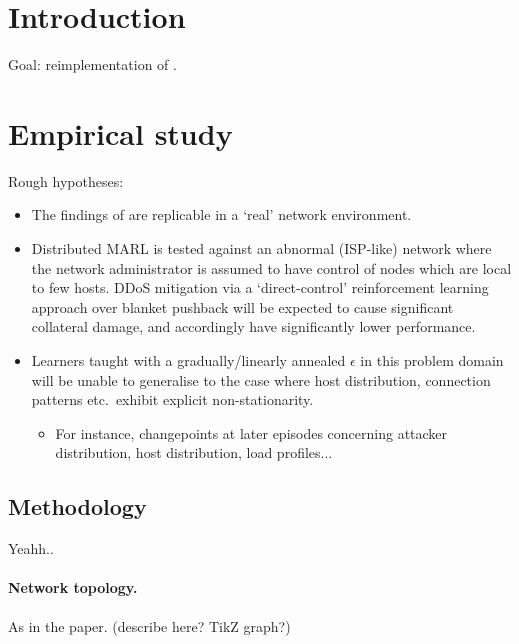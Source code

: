 \documentclass[10pt, a4paper]{article}
\title{\mytitle{}}
\author{Kyle A. Simpson}
\begin{document}

\maketitle

\section{Introduction}

Goal: reimplementation of \textcite{DBLP:journals/eaai/MalialisK15}.

\section{Empirical study}

Rough hypotheses:
\begin{itemize}
	\item The findings of \citeauthor{DBLP:journals/eaai/MalialisK15} are replicable in a `real' network environment.
	
	\item Distributed MARL is tested against an abnormal (ISP-like) network where the network administrator is assumed to have control of nodes which are local to few hosts.
	DDoS mitigation via a `direct-control' reinforcement learning approach over blanket pushback will be expected to cause significant collateral damage, and accordingly have significantly lower performance.
	
	\item Learners taught with a gradually/linearly annealed $\epsilon$ in this problem domain will be unable to generalise to the case where host distribution, connection patterns etc.\ exhibit explicit non-stationarity.
	\begin{itemize}
		\item For instance, changepoints at later episodes concerning attacker distribution, host distribution, load profiles...
	\end{itemize}
\end{itemize}

\subsection{Methodology}

Yeahh..

\paragraph{Network topology.}
As in the paper. (describe here? TikZ graph?)
\end{document}
